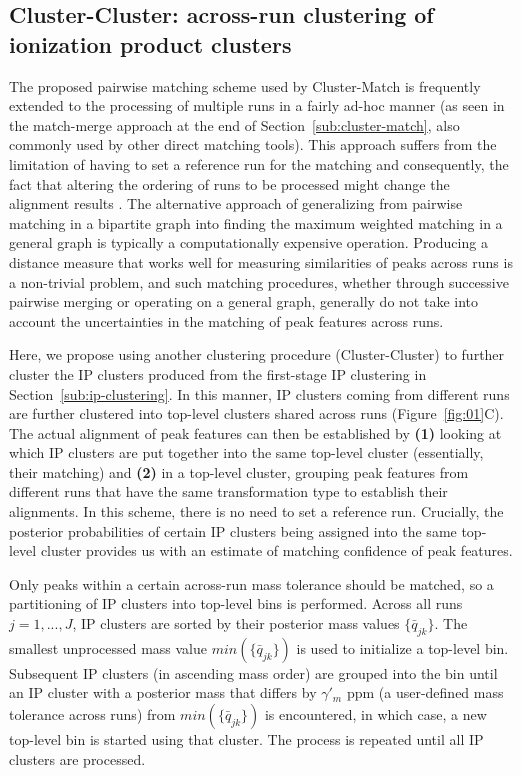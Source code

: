 \subsection{Cluster-Cluster: across-run clustering of ionization product clusters\label{sub:cluster-cluster}}

The proposed pairwise matching scheme used by Cluster-Match is frequently extended to the processing of multiple runs in a fairly ad-hoc manner (as seen in the match-merge approach at the end of Section~\ref{sub:cluster-match}, also commonly used by other direct matching tools). This approach suffers from the limitation of having to set a reference run for the matching and consequently, the fact that altering the ordering of runs to be processed might change the alignment results \cite{Smith2013}. The alternative approach of generalizing from pairwise matching in a bipartite graph into finding the maximum weighted matching in a general graph is typically a computationally expensive operation. Producing a distance measure that works well for measuring similarities of peaks across runs is a non-trivial problem, and such matching procedures, whether through successive pairwise merging or operating on a general graph, generally do not take into account the uncertainties in the matching of peak features across runs.

Here, we propose using another clustering procedure (Cluster-Cluster) to further cluster the IP clusters produced from the first-stage IP clustering in Section~\ref{sub:ip-clustering}. In this manner, IP clusters coming from different runs are further clustered into top-level clusters shared across runs (Figure~\ref{fig:01}C). The actual alignment of peak features can then be established by \textbf{(1)} looking at which IP clusters are put together into the same top-level cluster (essentially, their matching) and \textbf{(2)} in a top-level cluster, grouping peak features from different runs that have the same transformation type to establish their alignments. In this scheme, there is no need to set a reference run. Crucially, the posterior probabilities of certain IP clusters being assigned into the same top-level cluster provides us with an estimate of matching confidence of peak features.

Only peaks within a certain across-run mass tolerance should be matched, so a partitioning of IP clusters into top-level bins is performed. Across all runs $j=1,...,J$, IP clusters are sorted by their posterior mass values $\{{\bar{q}}_{jk}\}$. The smallest unprocessed mass value $min(\{{\bar{q}}_{jk}\})$ is used to initialize a top-level bin. Subsequent IP clusters (in ascending mass order) are grouped into the bin until an IP cluster with a posterior mass that differs by $\gamma'_m$ ppm (a user-defined mass tolerance across runs) from $min(\{{\bar{q}}_{jk}\})$ is encountered, in which case, a new top-level bin is started using that cluster. The process is repeated until all IP clusters are processed.

